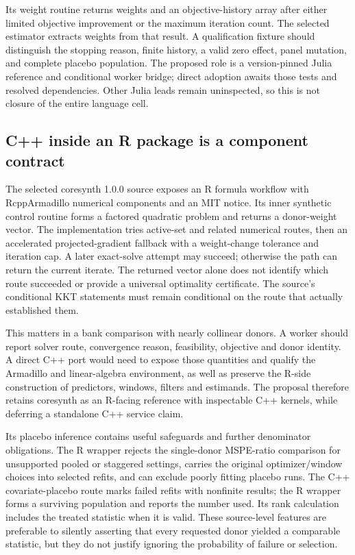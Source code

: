 Its weight routine returns weights and an objective-history array after
either limited objective improvement or the maximum iteration count.
The selected estimator extracts weights from that result. A qualification
fixture should distinguish the stopping reason, finite history, a valid
zero effect, panel mutation, and complete placebo population. The proposed
role is a version-pinned Julia reference and conditional worker bridge;
direct adoption awaits those tests and resolved dependencies. Other Julia
leads remain uninspected, so this is not closure of the entire language cell.
\citep{exec25_synthcross_julia,exec25_synthcross_choice}

\subsection{C++ inside an R package is a component contract}
The selected coresynth 1.0.0 source exposes an R formula workflow with
RcppArmadillo numerical components and an MIT notice. Its inner synthetic
control routine forms a factored quadratic problem and returns a donor-weight
vector. The implementation tries active-set and related numerical routes,
then an accelerated projected-gradient fallback with a weight-change
tolerance and iteration cap. A later exact-solve attempt may succeed;
otherwise the path can return the current iterate. The returned vector alone
does not identify which route succeeded or provide a universal optimality
certificate. The source's conditional KKT statements must remain conditional
on the route that actually established them.\citep{exec25_synthcross_core}

This matters in a bank comparison with nearly collinear donors. A worker
should report solver route, convergence reason, feasibility, objective and
donor identity. A direct C++ port would need to expose those quantities and
qualify the Armadillo and linear-algebra environment, as well as preserve
the R-side construction of predictors, windows, filters and estimands.
The proposal therefore retains coresynth as an R-facing reference with
inspectable C++ kernels, while deferring a standalone C++ service claim.
\citep{exec25_synthcross_core,exec25_synthcross_choice}

Its placebo inference contains useful safeguards and further denominator
obligations. The R wrapper rejects the single-donor MSPE-ratio comparison
for unsupported pooled or staggered settings, carries the original
optimizer/window choices into selected refits, and can exclude poorly
fitting placebo runs. The C++ covariate-placebo route marks failed refits
with nonfinite results; the R wrapper forms a surviving population and
reports the number used. Its rank calculation includes the treated statistic
when it is valid. These source-level features are preferable to silently
asserting that every requested donor yielded a comparable statistic, but
they do not justify ignoring the probability of failure or selection.
\citep{exec25_synthcross_core}

